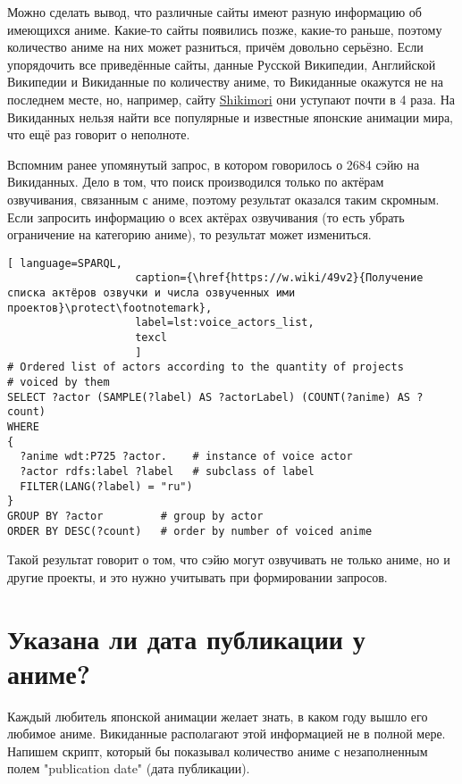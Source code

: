 Можно сделать вывод, что различные сайты имеют разную информацию об имеющихся аниме. Какие-то сайты появились позже, какие-то раньше, поэтому количество аниме на них может разниться, причём довольно серьёзно. Если упорядочить все приведённые сайты, данные Русской Википедии, Английской Википедии и Викиданные по количеству аниме, то Викиданные окажутся не на последнем месте, но, например, сайту \href{https://shikimori.one/}{Shikimori} они уступают почти в 4 раза. На Викиданных нельзя найти все популярные и известные японские анимации мира, что ещё раз говорит о неполноте.

Вспомним ранее упомянутый запрос, в котором говорилось о \num{2684} сэйю на Викиданных. Дело в том, что поиск производился только по актёрам озвучивания, связанным с аниме, поэтому результат оказался таким скромным. Если запросить информацию о всех актёрах озвучивания (то есть убрать ограничение на категорию аниме), то результат может измениться. 

\begin{lstlisting}[ language=SPARQL, 
                    caption={\href{https://w.wiki/49v2}{Получение списка актёров озвучки и числа озвученных ими проектов}\protect\footnotemark},
                    label=lst:voice_actors_list,
                    texcl 
                    ]
# Ordered list of actors according to the quantity of projects
# voiced by them
SELECT ?actor (SAMPLE(?label) AS ?actorLabel) (COUNT(?anime) AS ?count)
WHERE
{
  ?anime wdt:P725 ?actor.	 # instance of voice actor
  ?actor rdfs:label ?label	 # subclass of label
  FILTER(LANG(?label) = "ru")
}
GROUP BY ?actor		    # group by actor
ORDER BY DESC(?count)	# order by number of voiced anime
\end{lstlisting}%

Такой результат говорит о том, что сэйю могут озвучивать не только аниме, но и другие проекты, и это нужно учитывать при формировании запросов. 

\section{Указана ли дата публикации у аниме?}

Каждый любитель японской анимации желает знать, в каком году вышло его любимое аниме. Викиданные располагают этой информацией не в полной мере. Напишем скрипт, который бы показывал количество аниме с незаполненным полем "publication date" (дата публикации). 

